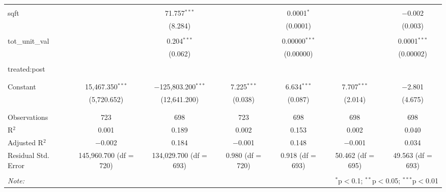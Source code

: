 \begin{table}[H]
{\begin{tabular}{@{\extracolsep{5pt}}lcccccc}
   & & & & & & \\  

  sqft &  & 71.757$^{***}$ &  & 0.0001$^{*}$ &  & $-$0.002 \\  

   &  & (8.284) &  & (0.0001) &  & (0.003) \\  

   & & & & & & \\  

  tot\_unit\_val &  & 0.204$^{***}$ &  & 0.00000$^{***}$ &  & 0.0001$^{***}$ \\  

   &  & (0.062) &  & (0.00000) &  & (0.00002) \\  

   & & & & & & \\  

  treated:post &  &  &  &  &  &  \\  

   &  &  &  &  &  &  \\  

   & & & & & & \\  

  Constant & 15,467.350$^{***}$ & $-$125,803.200$^{***}$ & 7.225$^{***}$ & 6.634$^{***}$ & 7.707$^{***}$ & $-$2.801 \\  

   & (5,720.652) & (12,641.200) & (0.038) & (0.087) & (2.014) & (4.675) \\  

   & & & & & & \\  

 \hline \\[-1.8ex]  

 Observations & 723 & 698 & 723 & 698 & 698 & 698 \\  

 R$^{2}$ & 0.001 & 0.189 & 0.002 & 0.153 & 0.002 & 0.040 \\  

 Adjusted R$^{2}$ & $-$0.002 & 0.184 & $-$0.001 & 0.148 & $-$0.001 & 0.034 \\  

 Residual Std. Error & 145,960.700 (df = 720) & 134,029.700 (df = 693) & 0.980 (df = 720) & 0.918 (df = 693) & 50.462 (df = 695) & 49.563 (df = 693) \\  

 \hline  

 \hline \\[-1.8ex]  

 \textit{Note:}  & \multicolumn{6}{r}{$^{*}$p$<$0.1; $^{**}$p$<$0.05; $^{***}$p$<$0.01} \\  

 \end{tabular}}  

 \end{table}  


